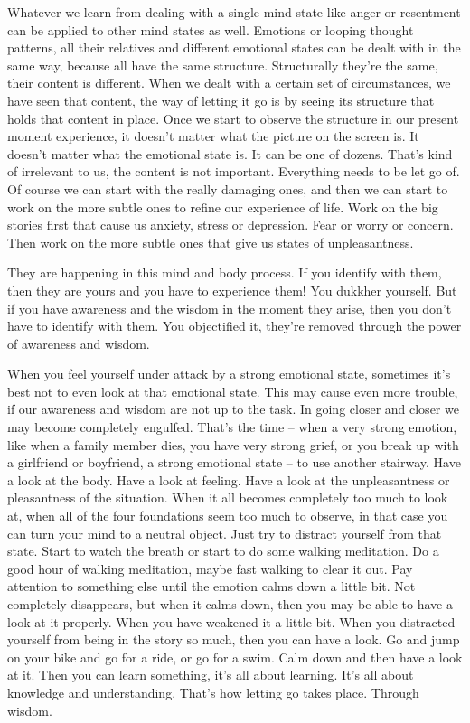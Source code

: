 \documentclass[letterpaper,10pt,english]{sphinxmanual}
\begin{document}
\sphinxAtStartPar
Whatever we learn from dealing with a single mind state like anger or
resentment can be applied to other mind states as well. Emotions or looping thought patterns, all their relatives and different emotional states can be
dealt with in the same way, because all have the same structure. Structurally
they’re the same, their content is different. When we dealt with a certain set
of circumstances, we have seen that content, the way of letting it go is by
seeing its structure that holds that content in place. Once we start to observe
the structure in our present moment experience, it doesn’t matter what the
picture on the screen is. It doesn’t matter what the emotional state is. It can
be one of dozens. That’s kind of irrelevant to us, the content is not important.
Everything needs to be let go of. Of course we can start with the really damaging ones, and then we can start to work on the more subtle ones to refine
our  experience  of  life. Work  on  the  big  stories  first  that  cause  us  anxiety,
stress or depression. Fear or worry or concern. Then work on the more subtle
ones that give us states of unpleasantness.

\sphinxAtStartPar
{}
They  are  happening  in  this  mind  and
body process. If you identify with them, then they are yours and you have
to experience them! You dukkher yourself. But if you have awareness and
the wisdom in the moment they arise, then you don’t have to identify with
them. You objectified it, they’re removed through the power of awareness
and wisdom.

\sphinxAtStartPar
When you feel yourself under attack by a strong emotional state, sometimes   it’s best not to even look at that emotional state. This may cause even
more trouble, if our awareness and wisdom are not up to the task. In going
closer  and  closer  we  may  become  completely  engulfed. That’s  the  time  –
when a very strong emotion, like when a family member dies, you have very
strong grief, or you break up with a girlfriend or boyfriend, a strong emotional state – to use another stairway. Have a look at the body. Have a look
at feeling. Have a look at the unpleasantness or pleasantness of the situation.
When it all becomes completely too much to look at, when all of the
four foundations seem too much to observe, in that case you can turn your
mind to a neutral object. Just try to distract yourself from that state. Start
to watch the breath or start to do some walking meditation. Do a good hour
of walking meditation, maybe fast walking to clear it out. Pay attention to
something  else  until  the  emotion  calms  down  a  little  bit.  Not  completely
disappears, but when it calms down, then you may be able to have a look
at it properly. When you have weakened it a little bit. When you distracted
yourself from being in the story so much, then you can have a look. Go and
jump on your bike and go for a ride, or go for a swim. Calm down and then
have a look at it. Then you can learn something, it’s all about learning. It’s
all about knowledge and understanding. That’s how letting go takes place.
Through wisdom.
\end{document}
